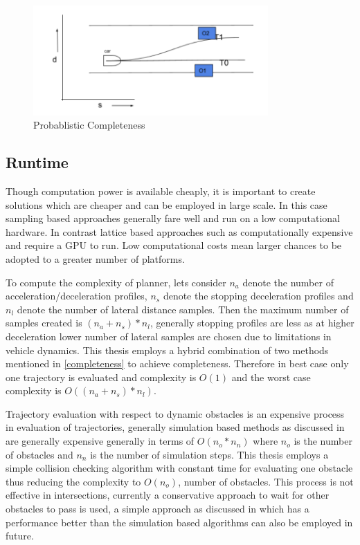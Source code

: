  \begin{figure}[h]
    \centering
    \includegraphics[width=0.8\textwidth]{Images/probablistically_complete.png}
    \caption{Probablistic Completeness}
    \label{probablistically_complete}
\end{figure}

\subsection{Runtime}

Though computation power is available cheaply, it is important to create solutions which are cheaper and can be employed in large scale. In this case sampling based approaches generally fare well and run on a low computational hardware. In contrast lattice based approaches such as \cite{cmu_parallel_thesis} \cite{diss_shui_phd_thesis} \cite{werling_frenet} computationally expensive and require a GPU to run. Low computational costs mean larger chances to be adopted to a greater number of platforms.

To compute the complexity of planner, lets consider $n_a$ denote the number of acceleration/deceleration profiles, $n_s$ denote the stopping deceleration profiles and $n_l$ denote the number of lateral distance samples. Then the maximum number of samples created is $(n_a+n_s)*n_l$, generally stopping profiles are less as at higher deceleration lower number of lateral samples are chosen due to limitations in vehicle dynamics. This thesis employs a hybrid combination of two methods mentioned in \ref{completeness} to achieve completeness. Therefore in best case only one trajectory is evaluated and complexity is $O(1)$ and the worst case complexity is $O((n_a+n_s)*n_l)$.

Trajectory evaluation with respect to dynamic obstacles is an expensive process in evaluation of trajectories, generally simulation based methods as discussed in  \cite{kolski_thesis} are generally expensive generally in terms of $O(n_o*n_n)$ where $n_o$ is the number of obstacles and $n_n$ is the number of simulation steps. This thesis employs a simple collision checking algorithm with constant time for evaluating one obstacle thus reducing the complexity to $O(n_o)$, number of obstacles. This process is not effective in intersections, currently a conservative approach to wait for other obstacles to pass is used, a simple approach as discussed in \cite{rrt_star} which has a performance better than the simulation based algorithms can also be employed in future.  

